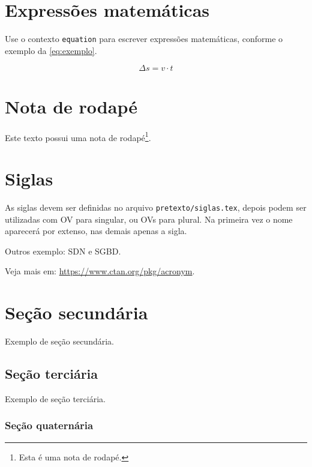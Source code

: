 \section{Expressões matemáticas}\label{texto:exemplo:expressoesmatematicas}

Use o contexto \texttt{equation} para escrever
expressões matemáticas, conforme o exemplo da \autoref{eq:exemplo}.

\begin{equation}
    \label{eq:exemplo}
    \Delta s  = v \cdot t
\end{equation}

\section{Nota de rodapé}\label{texto:exemplo:notarodape}

Este texto possui uma nota de rodapé\footnote{Esta é uma nota de rodapé.}.

\section{Siglas}\label{texto:exemplo:siglas}

As siglas devem ser definidas no arquivo \texttt{pretexto/siglas.tex}, depois podem ser utilizadas com \ac{OV} para singular, ou \acp{OV} para plural. Na primeira vez o nome aparecerá por extenso, nas demais apenas a sigla.

Outros exemplo: \ac{SDN} e \ac{SGBD}.

Veja mais em: \url{https://www.ctan.org/pkg/acronym}.

\section{Seção secundária}\label{texto:exemplo:secao-secundaria}

Exemplo de seção secundária.

\subsection{Seção terciária}\label{texto:exemplo:secao-secundaria:secao-terciaria}

Exemplo de seção terciária.

\subsubsection{Seção quaternária}\label{texto:exemplo:secao-secundaria:secao-terciaria:secao-quaternaria}

